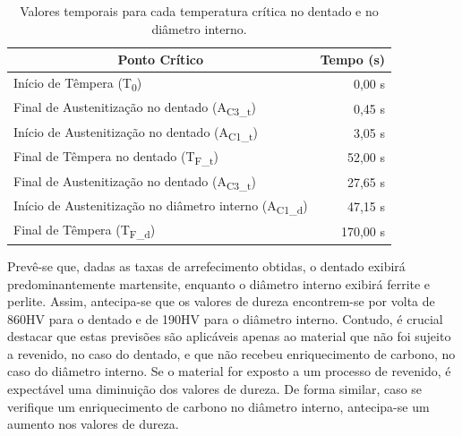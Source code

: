 \begin{table}[htb]
    \centering
    \caption[Valores temporais para cada temperatura crítica]{Valores temporais para cada temperatura crítica no dentado e no diâmetro interno.}
    \label{tab:pontos_sim}
    \begin{tabular}{lr} 
    \toprule
    \multicolumn{1}{c}{\textbf{Ponto Crítico}}            & \multicolumn{1}{c}{\textbf{Tempo (s)}}                         \\ 
    \hline\hline
    Início de Têmpera (T\textsubscript{0})                                & 0,00 s                                         \\ 
    \hline
    Final de Austenitização no dentado (A\textsubscript{C3\_t})           & 0,45 s                                         \\
    Início de Austenitização no dentado (A\textsubscript{C1\_t})          & 3,05 s                                         \\
    Final de Têmpera no dentado (T\textsubscript{F\_t})                   & 52,00 s                                        \\ 
    \hline\hline
    Final de Austenitização no dentado (A\textsubscript{C3\_t})           & 27,65 s                                        \\
    Início de Austenitização no diâmetro interno (A\textsubscript{C1\_d}) & 47,15 s                                        \\ 
    Final de Têmpera (T\textsubscript{F\_d})                              & 170,00 s                                       \\
    \bottomrule
    \end{tabular}
\end{table}
\par
Prevê-se que, dadas as taxas de arrefecimento obtidas, o dentado exibirá predominantemente martensite, enquanto o diâmetro interno exibirá ferrite e perlite. Assim, antecipa-se que os valores de dureza encontrem-se por volta de 860HV para o dentado e de 190HV para o diâmetro interno. Contudo, é crucial destacar que estas previsões são aplicáveis apenas ao material que não foi sujeito a revenido, no caso do dentado, e que não recebeu enriquecimento de carbono, no caso do diâmetro interno. Se o material for exposto a um processo de revenido, é expectável uma diminuição dos valores de dureza. De forma similar, caso se verifique um enriquecimento de carbono no diâmetro interno, antecipa-se um aumento nos valores de dureza.
